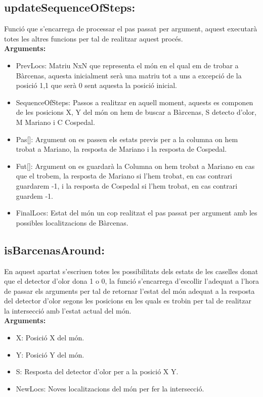 \documentclass[11pt]{article}
\begin{document}
\subsection{updateSequenceOfSteps:}
Funció que s'encarrega de processar el pas passat per argument, aquest executarà totes les altres funcions per tal de realitzar aquest procés.\\
\textbf{Arguments:}
\begin{itemize}
\item PrevLocs: Matriu NxN que representa el món en el qual em de trobar a Bàrcenas, aquesta inicialment serà una matriu tot a uns a excepció de la posició 1,1 que serà 0 sent aquesta la posició inicial.
\item SequenceOfSteps: Passos a realitzar en aquell moment, aquests es componen de les posicions X, Y del món on hem de buscar a Bàrcenas, S detecto d'olor, M Mariano i C Cospedal.
\item Pas[]: Argument on es passen els estats previs per a la columna on hem trobat a Mariano, la resposta de Mariano i la resposta de Cospedal.
\item Fut[]: Argument on es guardarà la Columna on hem trobat a Mariano en cas que el trobem, la resposta de Mariano si l'hem trobat, en cas contrari guardarem -1, i la resposta de Cospedal si l'hem trobat, en cas contrari guardem -1.
\item FinalLocs: Estat del món un cop realitzat el pas passat per argument amb les possibles localitzacions de Bàrcenas.
\end{itemize}
\subsection{isBarcenasAround:}
En aquest apartat s'escriuen totes les possibilitats dels estats de les caselles donat que el detector d'olor dona 1 o 0, la funció s'encarrega d'escollir l'adequat a l'hora de passar els arguments per tal de retornar l'estat del món adequat a la resposta del detector d'olor segons les posicions en les quals es trobin per tal de realitzar la intersecció amb l'estat actual del món.\\
\textbf{Arguments:}
\begin{itemize}
\item X: Posició X del món.
\item Y: Posició Y del món.
\item S: Resposta del detector d'olor per a la posició X Y.
\item NewLocs: Noves localitzacions del món per fer la intersecció.
\end{itemize}
\end{document}

